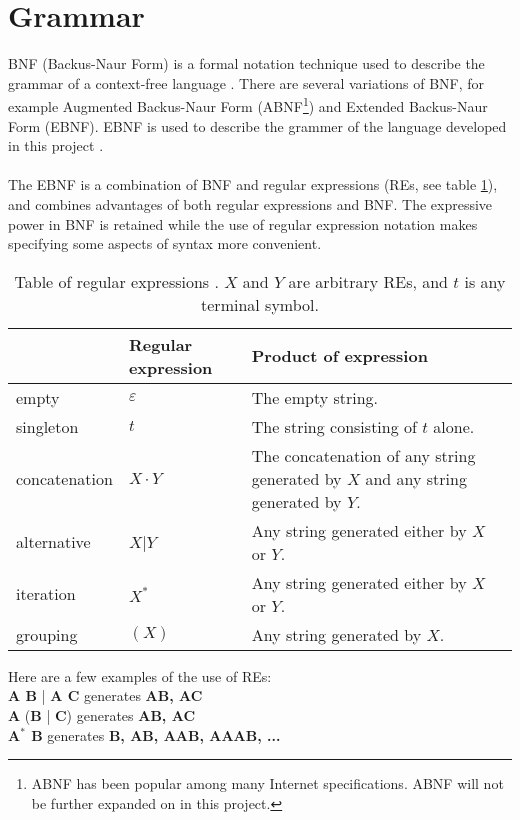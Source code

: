 \section{Grammar}
\label{sec:ebnf}

BNF (Backus-Naur Form) is a formal notation technique used to describe the grammar of a context-free language \cite{misc:ss}. There are several variations of BNF, for example Augmented Backus-Naur Form (ABNF\footnote{ABNF has been popular among many
   Internet specifications. ABNF will not be further expanded on in this project.}) and Extended Backus-Naur Form (EBNF). EBNF is used to describe the grammer of the language developed in this project \cite{misc:spo}.\\
\\
The EBNF is a combination of BNF and regular expressions (REs, see table \ref{tab:re}), and combines advantages of both regular expressions and BNF. The expressive power in BNF is retained while the use of regular expression notation makes specifying some aspects of syntax more convenient.

\begin{center}
	\begin{table}[H]
    \begin{tabular}{ | l | l | p{6.5cm} |}
    \hline
     & Regular expression & Product of expression\\ \hline
    empty & $\varepsilon$ & The empty string.\\ \hline
    singleton & $t$ & The string consisting of $t$ alone.\\ \hline
    concatenation & $X \cdot Y$ & The concatenation of any string generated	by $X$ and any string generated by $Y$.\\ \hline
		alternative & $X$|$Y$ & Any string generated either by $X$ or $Y$.\\ \hline
		iteration & $X^*$ & Any string generated either by $X$ or $Y$.\\ \hline
		grouping & $(X)$ & Any string generated by $X$.\\ \hline
    \end{tabular}
		\caption{Table of regular expressions \cite{misc:spo}. $X$ and $Y$ are arbitrary REs, and $t$ is any terminal symbol.}
		\label{tab:re}
	\end{table}
\end{center}

Here are a few examples of the use of REs: \\
\textbf{A B} | \textbf{A C} generates \textbf{{AB, AC}} \\
\textbf{A} (\textbf{B} | \textbf{C}) generates \textbf{{AB, AC}} \\
\textbf{A$^*$ B} generates \textbf{{B, AB, AAB, AAAB, ...}} \\

